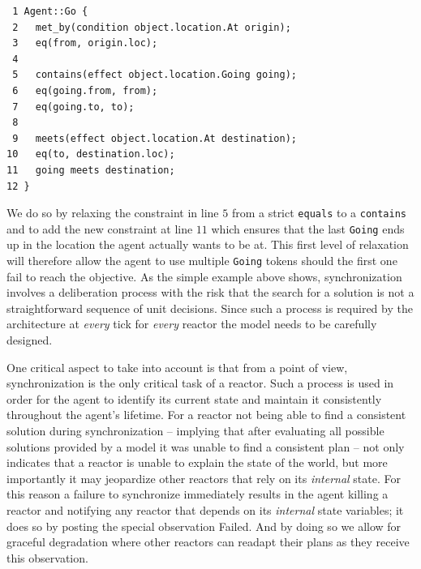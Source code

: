\begin{verbatim}
 1 Agent::Go {
 2   met_by(condition object.location.At origin);
 3   eq(from, origin.loc);
 4
 5   contains(effect object.location.Going going);
 6   eq(going.from, from);
 7   eq(going.to, to);
 8   
 9   meets(effect object.location.At destination);
10   eq(to, destination.loc);
11   going meets destination;
12 }
\end{verbatim}

We do so by relaxing the constraint in line $5$ from a strict
\texttt{equals} to a \texttt{contains} and to add the new constraint
at line $11$ which ensures that the last \texttt{Going} ends up in the
location the agent actually wants to be at. This first level of
relaxation will therefore allow the agent to use multiple
\texttt{Going} tokens should the first one fail to reach the
objective.  %
As the simple example above shows, synchronization involves a
deliberation process with the risk that the search for a solution is
not a straightforward sequence of unit decisions. Since such a process
is required by the architecture at \emph{every} tick for \emph{every}
reactor the model needs to be carefully designed.

One critical aspect to take into account is that from a \rx point of
view, synchronization is the only critical task of a reactor. Such a
process is used in order for the agent to identify its current state
and maintain it consistently throughout the agent's lifetime. For a
reactor not being able to find a consistent solution during
synchronization -- implying that after evaluating all possible
solutions provided by a model it was unable to find a consistent plan
-- not only indicates that a reactor is unable to explain the state of
the world, but more importantly it may jeopardize other reactors that
rely on its {\em internal} state. For this reason a failure to
synchronize immediately results in the agent killing a reactor and
notifying any reactor that depends on its {\em internal} state
variables; it does so by posting the special observation
\textsf{Failed}. And by doing so we allow for graceful degradation
where other reactors can readapt their plans as they receive this
observation.


